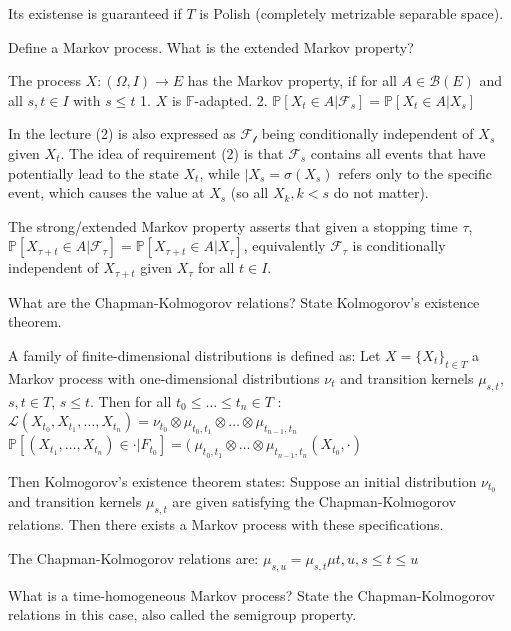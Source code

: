 Its existense is guaranteed if \( T \) is Polish (completely metrizable separable space).


Define a Markov process. What is the extended Markov property?

The process \( X : (\Omega, I) \to E\) has the Markov property, if
for all \( A \in \mathcal{B}(E) \) and all \( s, t \in I \) with \( s \leq t \)
1. \( X \) is \( \mathbb{F} \)-adapted.
2. \( \mathbb{P}[X_t \in A | \mathcal{F}_s] = \mathbb{P}[X_t \in A | X_s]\)

In the lecture (2) is also expressed as \( \mathcal{F_t} \) being conditionally independent of \( X_s \) given \( X_t \).
The idea of requirement (2) is that \( \mathcal{F}_s \) contains all events that have potentially
lead to the state \( X_t \), while \( |X_s = \sigma(X_s) \) refers only to the specific event, which causes the value at \( X_s \)
(so all \(X_k, k < s \) do not matter).

The strong/extended Markov property asserts that given a stopping time \( \tau \), \( \mathbb{P}[X_{\tau + t} \in A | \mathcal{F}_\tau] = \mathbb{P}[X_{\tau + t} \in A | X_\tau] \),
equivalently \( \mathcal{F_\tau} \) is conditionally independent of \( X_{\tau + t} \) given \( X_{\tau} \) for all \( t \in I \).

What are the Chapman-Kolmogorov relations? State Kolmogorov’s existence theorem.

A family of finite-dimensional distributions is defined as:
Let \( X = \{X_t\}_{t \in T} \) a Markov process with one-dimensional distributions \( \nu_t \) and transition kernels \( \mu_{s,t} \),
\( s, t \in T \), \( s \leq t \). Then for all \( t_0 \leq \dots \leq t_n \in T \) :
\( \mathcal{L}(X_{t_0} , X_{t_1}, \dots, X_{t_n}) = \nu_{t_0} \otimes \mu_{t_0,t_1} \otimes \dots \otimes \mu_{t_{n-1}, t_n} \)
\( \mathbb{P}[(X_{t_1}, \dots, X_{t_n}) \in \cdot | F_{t_0}] = (\ \mu_{t_0,t_1} \otimes \dots \otimes \mu_{t_{n-1}, t_n}(X_{t_0}, \cdot) \)

Then Kolmogorov’s existence theorem states:
Suppose an initial distribution \( \nu_{t_0} \) and transition kernels \( \mu_{s,t} \) are given satisfying the Chapman-Kolmogorov
relations. Then there exists a Markov process with these specifications.

The Chapman-Kolmogorov relations are:
\( \mu_{s,u} = \mu_{s, t}\mu{t,u}, s \leq t \leq u \)


What is a time-homogeneous Markov process? State the Chapman-Kolmogorov
relations in this case, also called the semigroup property.

